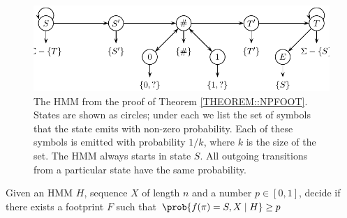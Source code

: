 \begin{figure}
\centerline{\includegraphics[scale=0.68]{../figures/jcss/cliquehmm.pdf}}
\caption[HMM for which footprint is NP-hard to optimize]{\label{fig:footprint_hmm} The HMM from the proof of Theorem
  \ref{THEOREM::NPFOOT}. States are shown as circles; under each we
  list the set of symbols that the state emits with non-zero
  probability. Each of these symbols is emitted with probability
  $1/k$, where $k$ is the size of the set. The HMM always starts in
  state $S$. All outgoing transitions from a particular state have
  the same probability.}
\end{figure}

\begin{definition*}
 Given an HMM $H$, sequence $X$
of length $n$ and a number $p\in [0,1]$, decide if there exists a footprint $F$
such that $\prob{f(\pi) = S, X\mid H}\geq p$
\end{definition*}

